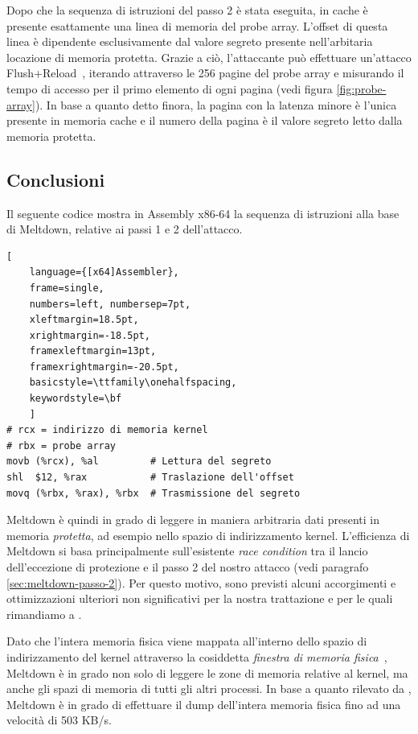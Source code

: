Dopo che la sequenza di istruzioni del passo 2 è stata eseguita, in cache è presente esattamente una linea di memoria del probe array.
L'offset di questa linea è dipendente esclusivamente dal valore segreto presente nell'arbitaria locazione di memoria protetta.
Grazie a ciò, l'attaccante può effettuare un'attacco Flush+Reload~\cite{yaron:flush-reload}, iterando attraverso le 256 pagine del probe array e misurando il tempo di accesso per il primo elemento di ogni pagina (vedi figura \ref{fig:probe-array}).
In base a quanto detto finora, la pagina con la latenza minore è l'unica presente in memoria cache e il numero della pagina è il valore segreto letto dalla memoria protetta.


\subsection{Conclusioni}
\label{sec:meltdown-conclusioni}
Il seguente codice mostra in Assembly x86-64 la sequenza di istruzioni alla base di Meltdown, relative ai passi 1 e 2 dell'attacco.

\begin{lstlisting}[
	language={[x64]Assembler},
	frame=single,
	numbers=left, numbersep=7pt,
	xleftmargin=18.5pt,
	xrightmargin=-18.5pt,
	framexleftmargin=13pt,
	framexrightmargin=-20.5pt,
	basicstyle=\ttfamily\onehalfspacing,
	keywordstyle=\bf
	]
# rcx = indirizzo di memoria kernel
# rbx = probe array
movb (%rcx), %al         # Lettura del segreto
shl  $12, %rax           # Traslazione dell'offset
movq (%rbx, %rax), %rbx  # Trasmissione del segreto
\end{lstlisting} 

Meltdown è quindi in grado di leggere in maniera arbitraria dati presenti in memoria \emph{protetta}, ad esempio nello spazio di indirizzamento kernel. 
L'efficienza di Meltdown si basa principalmente sull'esistente \emph{race condition} tra il lancio dell'eccezione di protezione e il passo 2 del nostro attacco (vedi paragrafo \vref{sec:meltdown-passo-2}). Per questo motivo, sono previsti alcuni accorgimenti e ottimizzazioni ulteriori non significativi per la nostra trattazione e per le quali rimandiamo a \textcite{lipp:meltdown}.

Dato che l'intera memoria fisica viene mappata all'interno dello spazio di indirizzamento del kernel attraverso la cosiddetta \emph{finestra di memoria fisica}~\cite{lettieri:paginazione-complementi}, Meltdown è in grado non solo di leggere le zone di memoria relative al kernel, ma anche gli spazi di memoria di tutti gli altri processi. In base a quanto rilevato da \textcite{lipp:meltdown}, Meltdown è in grado di effettuare il dump dell'intera memoria fisica fino ad una velocità di 503 KB/s.

